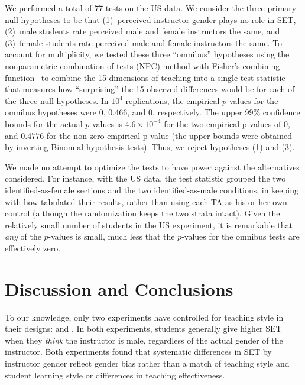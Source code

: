 \documentclass[12pt]{article}
\begin{document}
We performed a total of 77 tests on the US data.
We consider the three primary null hypotheses to be that 
(1)~perceived instructor gender plays no role in SET,
(2)~male students rate perceived male and female instructors the same, and
(3)~female students rate perceived male and female instructors the same.
To account for multiplicity, we tested these three ``omnibus'' hypotheses 
using the nonparametric combination of tests (NPC) method with Fisher's combining 
function~\citep[Chapter 4]{pesarinSalmaso10} to combine the 15 dimensions of teaching into
a single test statistic that measures how ``surprising'' the 15 observed differences would be
for each of the three null hypotheses.
In $10^4$ replications, the empirical $p$-values for the omnibus hypotheses were $0$, $0.466$, and $0$, respectively.
The upper 99\% confidence bounds for the actual $p$-values is $4.6 \times 10^{-4}$ for the two empirical p-values of 0, and $0.4776$ for the non-zero empirical p-value (the upper bounds were obtained by inverting Binomial hypothesis tests).
Thus, we reject hypotheses (1) and (3).

We made no attempt to optimize the tests to have power 
against the alternatives considered.
For instance, with the US data, the test statistic
grouped the two identified-as-female sections and the two identified-as-male conditions,
in keeping with how \citet{MacNell2014} tabulated their results,
rather than using each TA as his or her own control (although the randomization keeps the 
two strata intact). 
Given the relatively small number of students in the US experiment, it is remarkable that
\emph{any} of the $p$-values is small, much less that the $p$-values for the omnibus
tests are effectively zero.

\section{Discussion and Conclusions}
To our knowledge, only two experiments have controlled for teaching style in
their designs: \citet{Arbuckle2003} and \citet{MacNell2014}. 
In both experiments, students generally give higher SET when they \emph{think} the instructor
is male, regardless of the actual gender of the instructor.
Both experiments found that systematic differences in SET by instructor gender reflect gender bias 
rather than a match of teaching style and student learning style or differences
in teaching effectiveness. 
\end{document}
